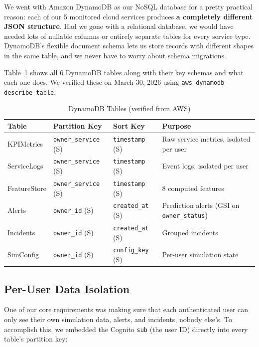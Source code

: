 \documentclass[11pt,a4paper]{article}
\begin{document}
We went with Amazon DynamoDB as our NoSQL database for a pretty practical reason: each of our 5 monitored cloud services produces \textbf{a completely different JSON structure}. Had we gone with a relational database, we would have needed lots of nullable columns or entirely separate tables for every service type. DynamoDB's flexible document schema lets us store records with different shapes in the same table, and we never have to worry about schema migrations.

Table~\ref{tab:dynamo-tables} shows all 6 DynamoDB tables along with their key schemas and what each one does. We verified these on March 30, 2026 using \texttt{aws dynamodb describe-table}.

\begin{table}[H]
\centering
\begin{tabular}{lllp{4.2cm}}
\toprule
\textbf{Table} & \textbf{Partition Key} & \textbf{Sort Key} & \textbf{Purpose} \\
\midrule
KPIMetrics & \texttt{owner\_service} (S) & \texttt{timestamp} (S) & Raw service metrics, isolated per user \\
ServiceLogs & \texttt{owner\_service} (S) & \texttt{timestamp} (S) & Event logs, isolated per user \\
FeatureStore & \texttt{owner\_service} (S) & \texttt{timestamp} (S) & 8 computed features \\
Alerts & \texttt{owner\_id} (S) & \texttt{created\_at} (S) & Prediction alerts (GSI on \texttt{owner\_status}) \\
Incidents & \texttt{owner\_id} (S) & \texttt{created\_at} (S) & Grouped incidents \\
SimConfig & \texttt{owner\_id} (S) & \texttt{config\_key} (S) & Per-user simulation state \\
\bottomrule
\end{tabular}
\caption{DynamoDB Tables (verified from AWS)}
\label{tab:dynamo-tables}
\end{table}

\subsection{Per-User Data Isolation}

One of our core requirements was making sure that each authenticated user can only see their own simulation data, alerts, and incidents, nobody else's. To accomplish this, we embedded the Cognito \texttt{sub} (the user ID) directly into every table's partition key:
\end{document}
